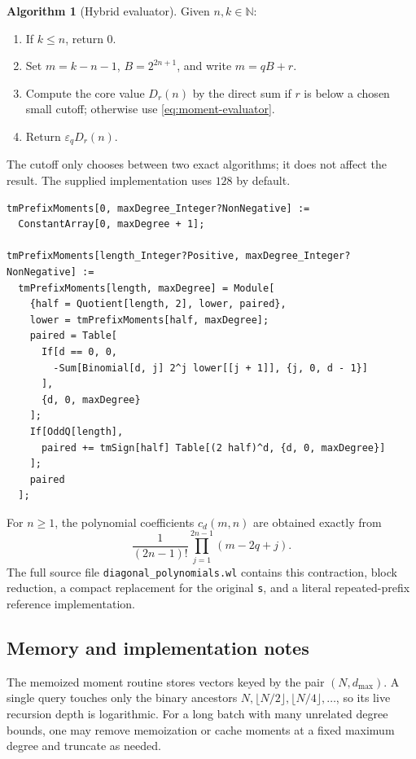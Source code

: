 \documentclass[11pt,oneside]{article}
\theoremstyle{definition}
\newtheorem{algorithm}[theorem]{Algorithm}
\theoremstyle{remark}
\newcommand{\N}{\mathbb N}
\newcommand{\eps}{\varepsilon}
\newcommand{\Diag}{D}
\begin{document}
\begin{algorithm}[Hybrid evaluator]
\label{alg:hybrid}
Given $n,k\in\N$:
\begin{enumerate}
 \item If $k\le n$, return $0$.
 \item Set $m=k-n-1$, $B=2^{2n+1}$, and write $m=qB+r$.
 \item Compute the core value $\Diag_r(n)$ by the direct sum if $r$ is below
       a chosen small cutoff; otherwise use \eqref{eq:moment-evaluator}.
 \item Return $\eps_q\Diag_r(n)$.
\end{enumerate}
\end{algorithm}

The cutoff only chooses between two exact algorithms; it does not affect the
result.  The supplied implementation uses $128$ by default.

\begin{lstlisting}[style=code,language=Wolfram]
tmPrefixMoments[0, maxDegree_Integer?NonNegative] :=
  ConstantArray[0, maxDegree + 1];

tmPrefixMoments[length_Integer?Positive, maxDegree_Integer?NonNegative] :=
  tmPrefixMoments[length, maxDegree] = Module[
    {half = Quotient[length, 2], lower, paired},
    lower = tmPrefixMoments[half, maxDegree];
    paired = Table[
      If[d == 0, 0,
        -Sum[Binomial[d, j] 2^j lower[[j + 1]], {j, 0, d - 1}]
      ],
      {d, 0, maxDegree}
    ];
    If[OddQ[length],
      paired += tmSign[half] Table[(2 half)^d, {d, 0, maxDegree}]
    ];
    paired
  ];
\end{lstlisting}

For $n\ge1$, the polynomial coefficients $c_d(m,n)$ are obtained exactly
from
\[
 \frac{1}{(2n-1)!}\prod_{j=1}^{2n-1}(m-2q+j).
\]
The full source file \texttt{diagonal\_polynomials.wl} contains this
contraction, block reduction, a compact replacement for the original
\texttt{s}, and a literal repeated-prefix reference implementation.

\subsection{Memory and implementation notes}

The memoized moment routine stores vectors keyed by the pair
$(N,d_{\max})$.  A single query touches only the binary ancestors
$N,\lfloor N/2\rfloor,\lfloor N/4\rfloor,\ldots$, so its live recursion
depth is logarithmic.  For a long batch with many unrelated degree bounds,
one may remove memoization or cache moments at a fixed maximum degree and
truncate as needed.
\end{document}
